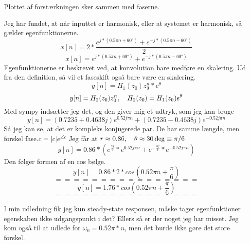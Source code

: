 \begin{Opgaver}
\begin{kapitel}
\begin{Opgave}
\begin{UnderOpgave}[Determine b so that $|H(e^{j\omega})|_{max} = 1$. Plot the resulting magnitude response.]
                Plottet af forstærkningen sker sammen med faserne. 
            \end{UnderOpgave}
            \begin{UnderOpgave}
                \vspace{10pt}
            \end{UnderOpgave}
            \begin{UnderOpgave}[\text{Determine analytically the response $y[n]$ to the input $x[n] = 2*cos(0.5*pi*n + 60\deg)$}]
                Jeg har fundet, at når inputtet er harmonisk, eller at systemet er harmonisk, så gælder egenfunktionerne.\\
                \[x[n] = 2 * \frac{e^{j*(0.5\pi n + 60°)} + e^{-j*(0.5\pi n - 60°)}}{2}\]
                \[x[n] = e^{j*(0.5\pi n + 60°)} + e^{-j*(0.5\pi n - 60°)}\]
                Egenfunktionerne er beskrevet ved, at konvolution bare medføre en skalering. Ud fra den definition, så vil et faseskift også bare være en skalering. 
                \[y[n] = H_1(z_0)z_0^n*e^\theta\]
                \[y[n] = H_2(z_0)z_0^n, \tab{0} H_2(z_0) = H_1(z_0)e^\theta\]
                Med sympy indsætter jeg det, og den giver mig et udtryk, som jeg kan bruge
                \[y[n] = (0.7235 + 0.4638j)e^{0.52j\pi n} + (0.7235 - 0.4638j)e^{-0.52j\pi n}\]
                Så jeg kan se, at det er kompleks konjugerede par. De har samme længde, men forskel fase.$c = |c|e^{\angle c}$
                Jeg får at $r \approx 0.86, \tab{0} \theta \approx 30\deg \equiv \pi/6$
                \[y[n] = 0.86 * (e^{\frac{\pi j}{6}}*e^{0.52j\pi n} + e^{-\frac{\pi j}{6}}*e^{-0.52j\pi n})\]
                Den følger formen af en cos bølge. 
                \[y[n] = 0.86 * 2 * cos(0.52\pi n + \frac{\pi}{6})\]
                \[================\]
                \[y[n] = 1.76 * cos(0.52\pi n + \frac{\pi}{6})\]
                \[================\]
            \end{UnderOpgave}
            \begin{UnderOpgave}
                \vspace{5pt} 
                I min udledning fik jeg kun steady-state responsen, måske tager egenfunktioner egenskaben ikke udgangspunkt i det? Ellers så er der noget jeg har misset. 
                Jeg kom også til at udlede for $\omega_0 = 0.52\pi * n$, men det burde ikke gøre det store forskel.\\

\end{UnderOpgave}
\end{Opgave}
\end{kapitel}
\end{Opgaver}
